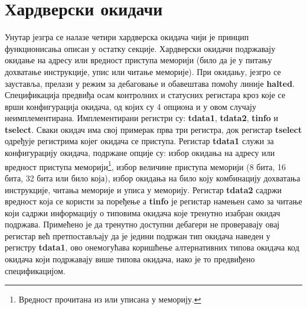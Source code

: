 

\section{Хардверски окидачи}

Унутар језгра се налазе четири хардверска окидача чији је принцип функционисања описан у остатку секције. Хардверски окидачи подржавају окидање на адресу или вредност приступа меморији (било да је у питању дохватање инструкције, упис или читање меморије). При окидању, језгро се зауставља, прелази у режим за дебаговање и обавештава  помоћу линије \textbf{halted}. Спецификација предвиђа осам контролних и статусних регистара кроз које се врши конфигурација окидача, од којих су 4 опциона и у овом случају неимплементирана. 
Имплементирани регистри су: \textbf{tdata1}, \textbf{tdata2}, \textbf{tinfo} и \textbf{tselect}. Сваки окидач има свој примерак прва три регистра, док регистар \textbf{tselect} одређује регистрима којег окидача се приступа. Регистар \textbf{tdata1} служи за конфигурацију окидача, подржане опције су: избор окидања на адресу или вредност приступа меморији\footnote{Вредност прочитана из или уписана у меморију.}, избор величине приступа меморији (8 бита, 16 бита, 32 бита или било која), избор окидања на било коју комбинацију дохватања инструкције, читања меморије и уписа у меморију. Регистар \textbf{tdata2} садржи вредност која се користи за поређење а \textbf{tinfo} је регистар намењен само за читање који садржи информацију о типовима окидача које тренутно изабран окидач подржава. Примећено је да тренутно доступни дебагери не проверавају овај регистар већ претпостављају да је једини подржан тип окидача наведен у регистру \textbf{tdata1}, ово онемогућава коришћење алтернативних типова окидача код окидача који подржавају више типова окидача, иако је то предвиђено спецификацијом.


